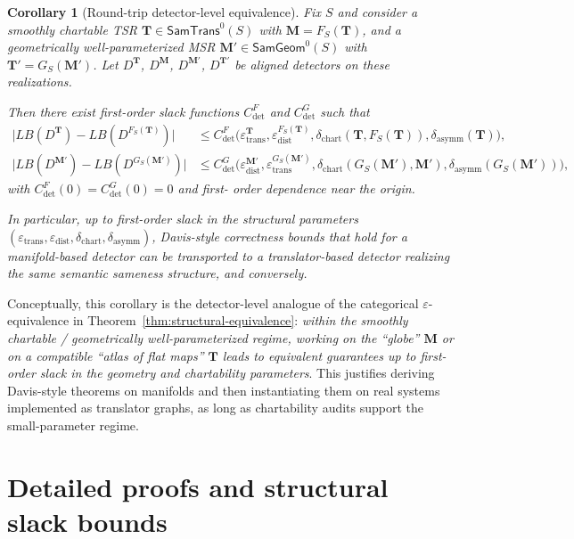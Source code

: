 \documentclass[11pt]{article}
\newtheorem{corollary}{Corollary}
\newcommand{\SamTrans}{\mathsf{SamTrans}}
\newcommand{\SamGeom}{\mathsf{SamGeom}}
\begin{document}
\begin{corollary}[Round-trip detector-level equivalence]
\label{cor:detector-equivalence}
Fix $S$ and consider a smoothly chartable TSR
$\mathbf{T} \in \SamTrans^0(S)$ with $\mathbf{M} = F_S(\mathbf{T})$, and a
geometrically well-parameterized MSR
$\mathbf{M}' \in \SamGeom^0(S)$ with $\mathbf{T}' = G_S(\mathbf{M}')$.
Let $D^{\mathbf{T}}$, $D^{\mathbf{M}}$, $D^{\mathbf{M}'}$,
$D^{\mathbf{T}'}$ be aligned detectors on these realizations.

Then there exist first-order slack functions
$C^{F}_{\mathrm{det}}$ and $C^{G}_{\mathrm{det}}$ such that
\begin{align}
\bigl|
  LB(D^{\mathbf{T}}) - LB(D^{F_S(\mathbf{T})})
\bigr|
&\le
C^{F}_{\mathrm{det}}\bigl(\varepsilon_{\mathrm{trans}}^{\mathbf{T}},
\varepsilon_{\mathrm{dist}}^{F_S(\mathbf{T})},
\delta_{\mathrm{chart}}(\mathbf{T}, F_S(\mathbf{T})),
\delta_{\mathrm{asymm}}(\mathbf{T})\bigr),
\\[0.25em]
\bigl|
  LB(D^{\mathbf{M}'}) - LB(D^{G_S(\mathbf{M}')})
\bigr|
&\le
C^{G}_{\mathrm{det}}\bigl(\varepsilon_{\mathrm{dist}}^{\mathbf{M}'},
\varepsilon_{\mathrm{trans}}^{G_S(\mathbf{M}')},
\delta_{\mathrm{chart}}(G_S(\mathbf{M}'), \mathbf{M}'),
\delta_{\mathrm{asymm}}(G_S(\mathbf{M}'))\bigr),
\end{align}
with $C^{F}_{\mathrm{det}}(0) = C^{G}_{\mathrm{det}}(0) = 0$ and first-
order dependence near the origin.

In particular, up to first-order slack in the structural parameters
$(\varepsilon_{\mathrm{trans}}, \varepsilon_{\mathrm{dist}},
\delta_{\mathrm{chart}}, \delta_{\mathrm{asymm}})$, Davis-style correctness
bounds that hold for a manifold-based detector can be transported to a
translator-based detector realizing the same semantic sameness structure,
and conversely.
\end{corollary}

Conceptually, this corollary is the detector-level analogue of the
categorical $\varepsilon$-equivalence in
Theorem~\ref{thm:structural-equivalence}: \emph{within the smoothly
chartable / geometrically well-parameterized regime, working on the
“globe” $\mathbf{M}$ or on a compatible “atlas of flat maps”
$\mathbf{T}$ leads to equivalent guarantees up to first-order slack in
the geometry and chartability parameters}.  This justifies deriving
Davis-style theorems on manifolds and then instantiating them on real
systems implemented as translator graphs, as long as chartability audits
support the small-parameter regime.
\section{Detailed proofs and structural slack bounds}
\label{sec:structural-equivalence-proofs}
\end{document}

